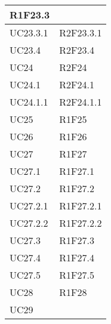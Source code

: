 \begin{center}
\begin{longtable}{|p{44mm}|p{22mm}|}
R1F23.3 \newline
\\
\hline
UC23.3.1 &

R2F23.3.1 \newline
\\
\hline
UC23.4 &

R2F23.4 \newline
\\
\hline
UC24 &

R2F24 \newline
\\
\hline
UC24.1 &

R2F24.1 \newline
\\
\hline
UC24.1.1 &

R2F24.1.1 \newline
\\
\hline
UC25 &

R1F25 \newline
\\
\hline
UC26 &

R1F26 \newline
\\
\hline
UC27 &

R1F27 \newline
\\
\hline
UC27.1 &

R1F27.1 \newline
\\
\hline
UC27.2 &

R1F27.2 \newline
\\
\hline
UC27.2.1 &

R1F27.2.1 \newline
\\
\hline
UC27.2.2 &

R1F27.2.2 \newline
\\
\hline
UC27.3 &

R1F27.3 \newline
\\
\hline
UC27.4 &

R1F27.4 \newline
\\
\hline
UC27.5 &

R1F27.5 \newline
\\
\hline
UC28 &

R1F28 \newline
\\
\hline
UC29 &


\end{longtable}
\end{center}
